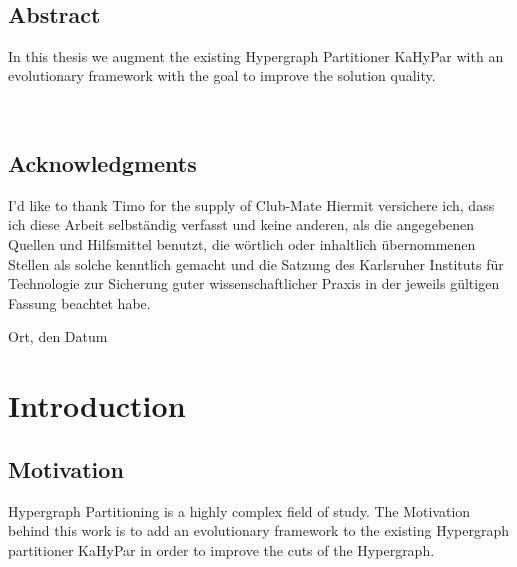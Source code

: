 \documentclass[a4paper,12pt,bibtotoc,titlepage, liststotoc,BCOR7mm,headsepline,pointlessnumbers]{scrbook}
\numberwithin{equation}{section}
\begin{document}

\ 
\newpage
\clearpage

\section*{Abstract}
In this thesis we augment the existing Hypergraph Partitioner KaHyPar with an evolutionary framework with the goal to improve the 
solution quality.
\vfill\vfill\vfill
\ 
\newpage
\clearpage
\ 
\newpage
\clearpage

\section*{Acknowledgments}

I'd like to thank Timo for the supply of Club-Mate
\vfill\vfill\vfill
Hiermit versichere ich, dass ich diese Arbeit selbständig verfasst und keine anderen, als die angegebenen Quellen und Hilfsmittel benutzt, die wörtlich oder inhaltlich übernommenen Stellen als solche kenntlich gemacht und die Satzung des Karlsruher Instituts für Technologie zur Sicherung guter wissenschaftlicher Praxis in der jeweils gültigen Fassung beachtet habe.

\bigskip
\vspace*{1cm}
\noindent
Ort, den Datum

\clearpage

\tableofcontents
\clearpage
\clearpage
\mainmatter
\pagestyle{plain}
\chapter{Introduction}
\pagestyle{headings}
\section{Motivation}
Hypergraph Partitioning is a highly complex field of study. The Motivation behind this work is to add an evolutionary
framework to the existing Hypergraph partitioner KaHyPar in order to improve the cuts of the Hypergraph.
\end{document}
